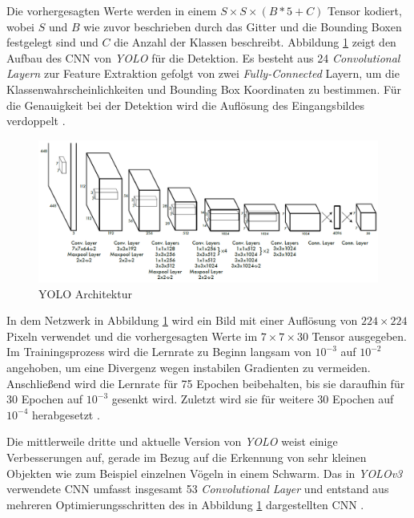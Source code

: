Die vorhergesagten Werte werden in einem $S \times S \times (B * 5 + C)$ Tensor kodiert, wobei $S$ und $B$ wie zuvor beschrieben durch das Gitter und die Bounding Boxen festgelegt sind und $C$ die Anzahl der Klassen beschreibt. Abbildung \ref{yolo_architecture} zeigt den Aufbau des CNN von \textit{YOLO} für die Detektion. Es besteht aus 24 \textit{Convolutional Layern} zur Feature Extraktion gefolgt von zwei \textit{Fully-Connected} Layern, um die Klassenwahrscheinlichkeiten und Bounding Box Koordinaten zu bestimmen. Für die Genauigkeit bei der Detektion wird die Auflösung des Eingangsbildes verdoppelt \cite{JosephRedmon.2016}. 

\begin{figure}[H]
	\begin{center}
		\includegraphics[width=15cm]{Bilder/yolo_architecture.png} 
		\caption[YOLO Architektur]{YOLO Architektur \cite{JosephRedmon.2016}}
		\label{yolo_architecture}
	\end{center}
\end{figure}

In dem Netzwerk in Abbildung \ref{yolo_architecture} wird ein Bild mit einer Auflösung von $224 \times 224$ Pixeln verwendet und die vorhergesagten Werte im $7 \times 7 \times 30$ Tensor ausgegeben. Im Trainingsprozess wird die Lernrate zu Beginn langsam von $10^{-3}$ auf $10^{-2}$ angehoben, um eine Divergenz wegen instabilen Gradienten zu vermeiden. Anschließend wird die Lernrate für 75 Epochen beibehalten, bis sie daraufhin für 30 Epochen auf $10^{-3}$ gesenkt wird. Zuletzt wird sie für weitere 30 Epochen auf $10^{-4}$ herabgesetzt \cite{JosephRedmon.2016}.

Die mittlerweile dritte und aktuelle Version von \textit{YOLO} weist einige Verbesserungen auf, gerade im Bezug auf die Erkennung von sehr kleinen Objekten wie zum Beispiel einzelnen Vögeln in einem Schwarm. Das in \textit{YOLOv3} verwendete CNN umfasst insgesamt 53 \textit{Convolutional Layer} und entstand aus mehreren Optimierungsschritten des in Abbildung \ref{yolo_architecture} dargestellten CNN \cite{JosephRedmon.2018}. 




